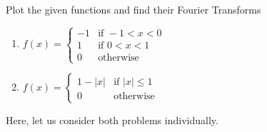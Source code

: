 \item Plot the given functions and find their Fourier Transforms
%
\begin{enumerate}
  \item
  $\displaystyle
  f(x) =
  \begin{cases}
    -1 & \text{if } -1 < x < 0\\
    1 &  \text{if } 0 < x < 1\\
    0 & \text{otherwise}
  \end{cases}
  $
  \item
  $\displaystyle
  f(x) =
  \begin{cases}
    1 - |x| & \text{if } |x| \leq 1\\
    0 & \text{otherwise}
  \end{cases}
  $
\end{enumerate}

\bigbreak

Here, let us consider both problems individually.

